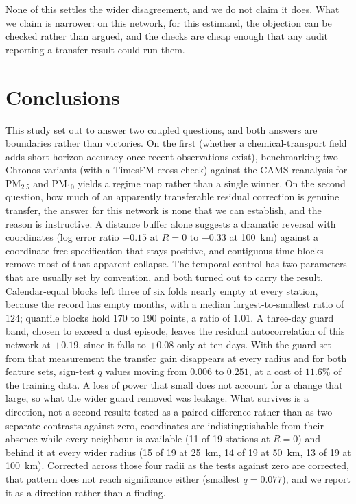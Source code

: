 \documentclass[review,times,authoryear]{elsarticle}
\newcommand*{\pmtf}{\ensuremath{\mathrm{PM_{2.5}}}}
\newcommand*{\pmten}{\ensuremath{\mathrm{PM_{10}}}}
\begin{document}
None of this settles the wider disagreement, and we do not claim it does. What we claim is
narrower: on this network, for this estimand, the objection can be checked rather than
argued, and the checks are cheap enough that any audit reporting a transfer result could
run them.

\section{Conclusions}
This study set out to answer two coupled questions, and both answers are boundaries rather than victories. On the first (whether a chemical-transport field adds short-horizon accuracy once recent observations exist), benchmarking two Chronos variants (with a TimesFM cross-check) against the CAMS reanalysis for \pmtf{} and \pmten{} yields a regime map rather than a single winner. On the second question, how much of an apparently transferable residual correction is genuine transfer, the answer for this network is none that we can establish, and the reason is instructive. A distance buffer alone suggests a dramatic reversal with coordinates (log error ratio $+0.15$ at $R=0$ to $-0.33$ at 100~km) against a coordinate-free specification that stays positive, and contiguous time blocks remove most of that apparent collapse. The temporal control has two parameters that are usually set by convention, and both turned out to carry the result. Calendar-equal blocks left three of six folds nearly empty at every station, because the record has empty months, with a median largest-to-smallest ratio of $124$; quantile blocks hold 170 to 190 points, a ratio of $1.01$. A three-day guard band, chosen to exceed a dust episode, leaves the residual autocorrelation of this network at $+0.19$, since it falls to $+0.08$ only at ten days. With the guard set from that measurement the transfer gain disappears at every radius and for both feature sets, sign-test $q$ values moving from $0.006$ to $0.251$, at a cost of $11.6\%$ of the training data. A loss of power that small does not account for a change that large, so what the wider guard removed was leakage. What survives is a direction, not a second result: tested as a paired difference rather than as two separate contrasts against zero, coordinates are indistinguishable from their absence while every neighbour is available (11 of 19 stations at $R=0$) and behind it at every wider radius (15 of 19 at 25~km, 14 of 19 at 50~km, 13 of 19 at 100~km). Corrected across those four radii as the tests against zero are corrected, that pattern does not reach significance either (smallest $q=0.077$), and we report it as a direction rather than a finding. 
\end{document}
